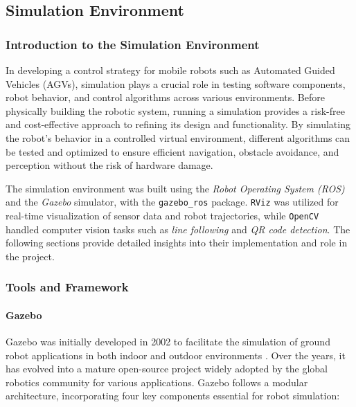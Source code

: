 \documentclass[../../main]{subfiles}
\begin{document}
\subsection{Simulation Environment}
\lstset{language=XML}
\subsubsection{Introduction to the Simulation Environment}
In developing a control strategy for mobile robots such as Automated Guided Vehicles (AGVs),
simulation plays a crucial role in testing software components, robot behavior, and control algorithms across various environments. 
Before physically building the robotic system, running a simulation provides a risk-free and cost-effective approach to refining 
its design and functionality. By simulating the robot's behavior in a controlled virtual environment, different algorithms can 
be tested and optimized to ensure efficient navigation, obstacle avoidance, and perception without the risk of hardware damage. 

The simulation environment was built using the \emph{Robot Operating System (ROS)} 
and the \emph{Gazebo} simulator, with the \texttt{gazebo\_ros} 
package. \texttt{RViz} was utilized for real-time visualization of sensor data and robot trajectories, 
while \texttt{OpenCV} handled computer vision tasks such as \textit{line following} and \textit{QR code detection}. The following sections provide 
detailed insights into their implementation and role in the project.\\
\newpage
\subsubsection{Tools and Framework}
\paragraph{Gazebo}

Gazebo was initially developed in 2002 to facilitate the simulation of ground robot applications in both indoor and outdoor environments \cite{koenig2004design}. 
Over the years, it has evolved into a mature open-source project widely adopted by the global robotics community for various applications. 
Gazebo follows a modular architecture, incorporating four key components essential for robot simulation:
\end{document}
